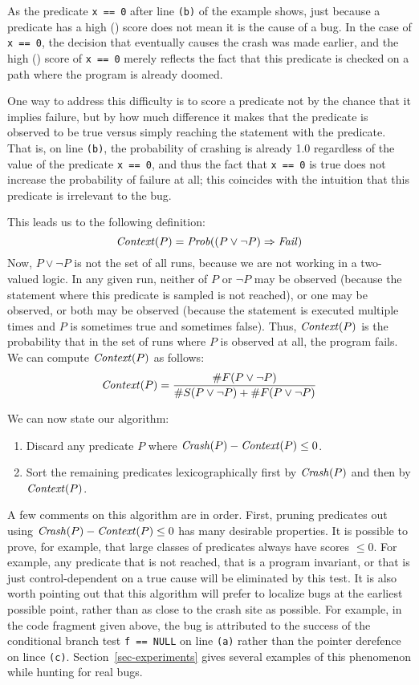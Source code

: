 As the predicate {\tt x == 0} after line {\tt (b)} of the example
shows, just because a predicate has a high \crash() score does not
mean it is the cause of a bug.  In the case of {\tt x == 0}, the
decision that eventually causes the crash was made earlier, and the
high \crash() score of {\tt x == 0} merely reflects the fact that this
predicate is checked on a path where the program is already doomed.

One way to address this difficulty is to score a predicate not by the chance
that it implies failure, but by how much difference it makes that the predicate
is observed to be true versus simply reaching the statement with the predicate.
That is, on line {\tt (b)}, the probability of crashing is already 1.0 regardless
of the value of the predicate {\tt x == 0}, and thus the fact that {\tt x == 0} is
true does not increase the probability of failure at all; this coincides with
the intuition that this predicate is irrelevant to the bug.

This leads us to the following definition:
\[ \mbox{\textit{Context}}(P) = \mbox{\textit{Prob}}((P \vee \neg P) \Rightarrow \mbox{\textit{Fail}}) \]
Now, $P \vee \neg P$ is not the set of all runs, because we are not working in a two-valued logic.
In any given run, neither of $P$ or $\neg P$ may be observed (because the statement where this predicate is
sampled is not reached), or one may be observed, or both may be observed (because the statement is executed
multiple times and $P$ is sometimes true and sometimes false).  Thus, $\mbox{\textit{Context}}(P)$ is the probability that
in the set of runs where $P$ is observed at all, the program fails. We can compute $\mbox{\textit{Context}}(P)$ as follows:
\[ \mbox{\textit{Context}}(P) = \frac{\#F(P \vee \neg P)}{\#S(P \vee \neg P) + \#F(P \vee \neg P)} \]

We can now state our algorithm:
\begin{enumerate}
\item Discard any predicate $P$ where $\mbox{\textit{Crash}}(P) - \mbox{\textit{Context}}(P) \leq 0$.

\item Sort the remaining predicates lexicographically first by $\mbox{\textit{Crash}}(P)$ and then by $\mbox{\textit{Context}}(P)$.
\end{enumerate}

A few comments on this algorithm are in order.  First, pruning
predicates out using $\mbox{\textit{Crash}}(P) - \mbox{\textit{Context}}(P) \leq 0$ has many
desirable properties.  It is possible to prove, for example, that
large classes of predicates always have scores $\leq 0$.  For example,
any predicate that is not reached, that is a program invariant, or
that is just control-dependent on a true cause will be eliminated by
this test.  It is also worth pointing out that this algorithm will
prefer to localize bugs at the earliest possible point, rather than
as close to the crash site as possible.  For example, in the code fragment
given above, the bug is attributed to the success of the conditional branch
test {\tt f == NULL} on line {\tt (a)} rather than the pointer derefence
on lince {\tt (c)}.  Section~\ref{sec-experiments} gives several examples of
this phenomenon while hunting for real bugs.

